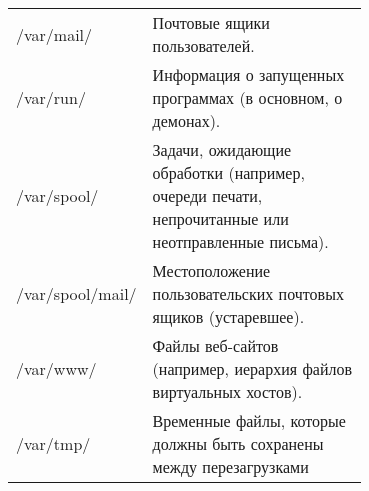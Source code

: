 \begin{table}
\begin{center}
\begin{tabular}{|l|p{0.7\linewidth}|}
/var/mail/ &	Почтовые ящики пользователей. \\
/var/run/ &	Информация о запущенных программах (в основном, о демонах). \\
/var/spool/ &	Задачи, ожидающие обработки (например, очереди печати, непрочитанные или неотправленные письма). \\
/var/spool/mail/ &	Местоположение пользовательских почтовых ящиков (устаревшее). \\
/var/www/ &	Файлы веб-сайтов (например, иерархия файлов виртуальных хостов). \\
/var/tmp/ &	Временные файлы, которые должны быть сохранены между перезагрузками \\
\hline
\end{tabular}
\end{center}
\end{table}

